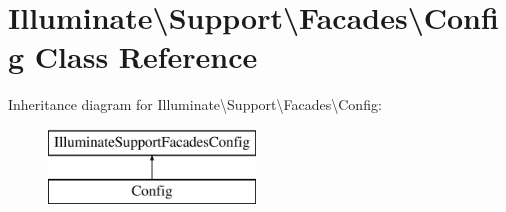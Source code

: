 \hypertarget{class_illuminate_1_1_support_1_1_facades_1_1_config}{}\section{Illuminate\textbackslash{}Support\textbackslash{}Facades\textbackslash{}Config Class Reference}
\label{class_illuminate_1_1_support_1_1_facades_1_1_config}
Inheritance diagram for Illuminate\textbackslash{}Support\textbackslash{}Facades\textbackslash{}Config\+:\begin{figure}[H]
\begin{center}
\leavevmode
\includegraphics[height=2.000000cm]{class_illuminate_1_1_support_1_1_facades_1_1_config}
\end{center}
\end{figure}
